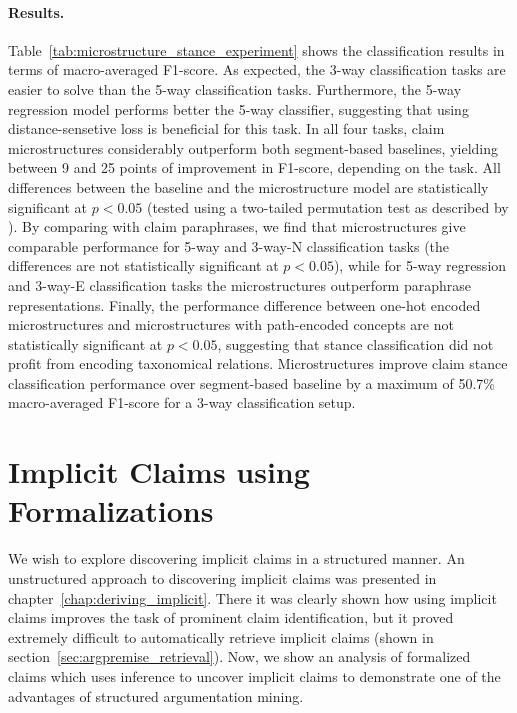 \paragraph{Results. }
Table~\ref{tab:microstructure_stance_experiment} shows the classification
results in terms of macro-averaged F1-score.  As expected, the 3-way
classification tasks are easier to solve than the 5-way classification tasks.
Furthermore, the 5-way regression model performs better the 5-way classifier,
suggesting that using distance-sensetive loss is beneficial for this
task. In all four tasks, claim microstructures considerably outperform
both segment-based baselines, yielding between 9 and 25 points of
improvement in F1-score, depending on the task.
All differences between the baseline and the microstructure model 
are statistically significant at $p < 0.05$ (tested using
a two-tailed permutation test as described by \citet{yeh2000more}).
By comparing with claim paraphrases, we find that microstructures give
comparable performance for 5-way and 3-way-N classification tasks
(the differences are not statistically significant at $p < 0.05$),
while for 5-way regression and 3-way-E classification tasks
the microstructures outperform paraphrase representations. Finally, 
the performance difference between one-hot encoded microstructures
and microstructures with path-encoded concepts are not statistically
significant at $p < 0.05$, suggesting that stance classification did not
profit from encoding taxonomical relations. 
Microstructures improve claim stance classification performance over 
segment-based baseline by a maximum of 50.7\% macro-averaged F1-score
for a 3-way classification setup.

\section{Implicit Claims using Formalizations}
\label{sec:implicit_formalization}

We wish to explore discovering implicit claims in a structured manner. 
An unstructured approach to discovering implicit claims 
was presented in chapter~\ref{chap:deriving_implicit}. There it was clearly
shown how using implicit claims improves the task of prominent 
claim identification, but it proved extremely difficult to automatically retrieve 
implicit claims (shown in section~\ref{sec:argpremise_retrieval}). 
Now, we show an analysis of formalized claims which uses inference to uncover
implicit claims to demonstrate one of the advantages of structured
argumentation mining. 

